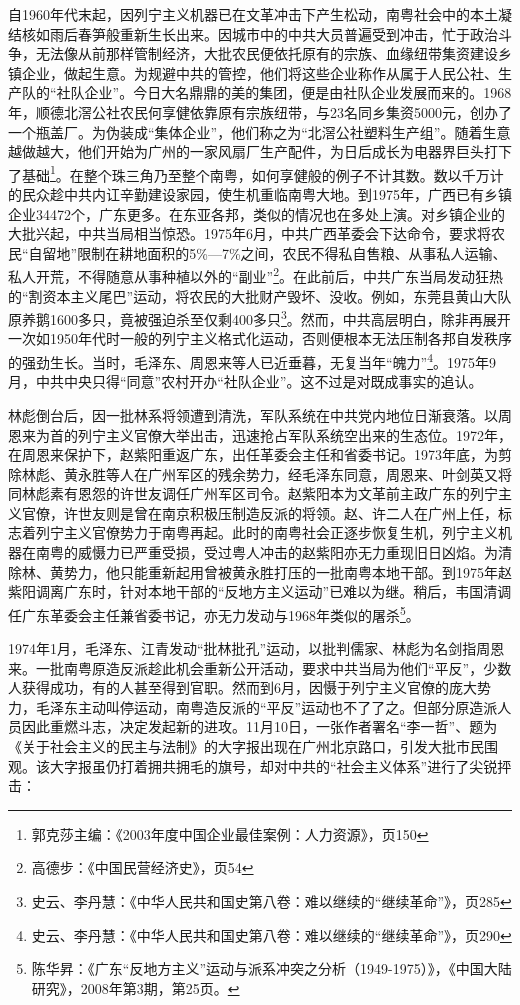 自1960年代末起，因列宁主义机器已在文革冲击下产生松动，南粤社会中的本土凝结核如雨后春笋般重新生长出来。因城市中的中共大员普遍受到冲击，忙于政治斗争，无法像从前那样管制经济，大批农民便依托原有的宗族、血缘纽带集资建设乡镇企业，做起生意。为规避中共的管控，他们将这些企业称作从属于人民公社、生产队的“社队企业”。今日大名鼎鼎的美的集团，便是由社队企业发展而来的。1968年，顺德北滘公社农民何享健依靠原有宗族纽带，与23名同乡集资5000元，创办了一个瓶盖厂。为伪装成“集体企业”，他们称之为“北滘公社塑料生产组”。随着生意越做越大，他们开始为广州的一家风扇厂生产配件，为日后成长为电器界巨头打下了基础\footnote{郭克莎主编：《2003年度中国企业最佳案例：人力资源》，页150}。在整个珠三角乃至整个南粤，如何享健般的例子不计其数。数以千万计的民众趁中共内讧辛勤建设家园，使生机重临南粤大地。到1975年，广西已有乡镇企业34472个，广东更多。在东亚各邦，类似的情况也在多处上演。对乡镇企业的大批兴起，中共当局相当惊恐。1975年6月，中共广西革委会下达命令，要求将农民“自留地”限制在耕地面积的5\%—7\%之间，农民不得私自售粮、从事私人运输、私人开荒，不得随意从事种植以外的“副业”\footnote{高德步：《中国民营经济史》，页54}。在此前后，中共广东当局发动狂热的“割资本主义尾巴”运动，将农民的大批财产毁坏、没收。例如，东莞县黄山大队原养鹅1600多只，竟被强迫杀至仅剩400多只\footnote{史云、李丹慧：《中华人民共和国史第八卷：难以继续的“继续革命”》，页285}。然而，中共高层明白，除非再展开一次如1950年代时一般的列宁主义格式化运动，否则便根本无法压制各邦自发秩序的强劲生长。当时，毛泽东、周恩来等人已近垂暮，无复当年“魄力”\footnote{史云、李丹慧：《中华人民共和国史第八卷：难以继续的“继续革命”》，页290}。1975年9月，中共中央只得“同意”农村开办“社队企业”。这不过是对既成事实的追认。

林彪倒台后，因一批林系将领遭到清洗，军队系统在中共党内地位日渐衰落。以周恩来为首的列宁主义官僚大举出击，迅速抢占军队系统空出来的生态位。1972年，在周恩来保护下，赵紫阳重返广东，出任革委会主任和省委书记。1973年底，为剪除林彪、黄永胜等人在广州军区的残余势力，经毛泽东同意，周恩来、叶剑英又将同林彪素有恩怨的许世友调任广州军区司令。赵紫阳本为文革前主政广东的列宁主义官僚，许世友则是曾在南京积极压制造反派的将领。赵、许二人在广州上任，标志着列宁主义官僚势力于南粤再起。此时的南粤社会正逐步恢复生机，列宁主义机器在南粤的威慑力已严重受损，受过粤人冲击的赵紫阳亦无力重现旧日凶焰。为清除林、黄势力，他只能重新起用曾被黄永胜打压的一批南粤本地干部。到1975年赵紫阳调离广东时，针对本地干部的“反地方主义运动”已难以为继。稍后，韦国清调任广东革委会主任兼省委书记，亦无力发动与1968年类似的屠杀\footnote{陈华昇：《广东“反地方主义”运动与派系冲突之分析（1949-1975）》，《中国大陆研究》，2008年第3期，第25页。}。

1974年1月，毛泽东、江青发动“批林批孔”运动，以批判儒家、林彪为名剑指周恩来。一批南粤原造反派趁此机会重新公开活动，要求中共当局为他们“平反”，少数人获得成功，有的人甚至得到官职。然而到6月，因慑于列宁主义官僚的庞大势力，毛泽东主动叫停运动，南粤造反派的“平反”运动也不了了之。但部分原造派人员因此重燃斗志，决定发起新的进攻。11月10日，一张作者署名“李一哲”、题为《关于社会主义的民主与法制》的大字报出现在广州北京路口，引发大批市民围观。该大字报虽仍打着拥共拥毛的旗号，却对中共的“社会主义体系”进行了尖锐抨击：


